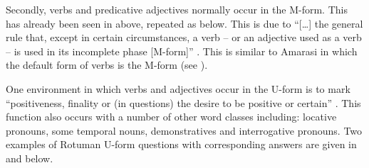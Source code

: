 Secondly, verbs and predicative adjectives normally occur in the M-form.
This has already been seen in  above, repeated as  below.
This is due to ``[\ldots] the general rule that, except in certain circumstances, a verb
-- or an adjective used as a verb -- is used in its incomplete phase [M-form]'' \citep[15]{ch40}.
This is similar to Amarasi in which the default form of verbs is the M-form
(see ).

\begin{exe}\let\eachwordone=\it
	\label{ex2:ThePeoAre}
\end{exe}

One environment in which verbs and adjectives occur in the U-form is to mark
``positiveness, finality or (in questions) the desire to be positive or certain'' \citep[88]{ch40}.
This function also occurs with a number of other word classes including:
locative pronouns, some temporal nouns, demonstratives and interrogative pronouns.
Two examples of Rotuman U-form questions with corresponding answers
are given in  and  below.

\begin{multicols}{2}
	\begin{exe}\let\eachwordone=\it
		\label{ex:RotQA1}
	\end{exe}
\end{multicols}
\begin{multicols}{2}
	\begin{exe}\let\eachwordone=\it
		\label{ex:RotQA2}
	\end{exe}
\end{multicols}


